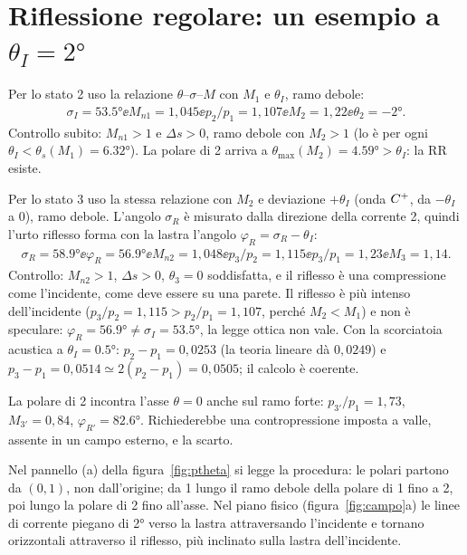 \section*{Riflessione regolare: un esempio a $\theta_I=\ang{2}$}
Per lo stato 2 uso la relazione $\theta$--$\sigma$--$M$ con $M_1$ e $\theta_I$, ramo debole:
\begin{gather*}
\sigma_I=\ang{53.5}\ee M_{n1}=1{,}045\ee p_2/p_1=1{,}107\ee M_2=1{,}22\ee \theta_2=-\ang{2}.
\end{gather*}
Controllo subito: $M_{n1}>1$ e $\Delta s>0$, ramo debole con $M_2>1$ (lo è per ogni $\theta_I<\theta_s(M_1)=\ang{6.32}$).
La polare di 2 arriva a $\theta_{\max}(M_2)=\ang{4.59}>\theta_I$: la RR esiste.

Per lo stato 3 uso la stessa relazione con $M_2$ e deviazione $+\theta_I$ (onda $C^{+}$, da $-\theta_I$ a 0), ramo
debole. L'angolo $\sigma_R$ è misurato dalla direzione della corrente 2, quindi l'urto riflesso forma con la lastra
l'angolo $\varphi_R=\sigma_R-\theta_I$:
\begin{gather*}
\sigma_R=\ang{58.9}\ee \varphi_R=\ang{56.9}\ee M_{n2}=1{,}048\ee p_3/p_2=1{,}115\ee p_3/p_1=1{,}23\ee M_3=1{,}14.
\end{gather*}
Controllo: $M_{n2}>1$, $\Delta s>0$, $\theta_3=0$ soddisfatta, e il riflesso è una compressione come l'incidente, come
deve essere su una parete. Il riflesso è più intenso dell'incidente ($p_3/p_2=1{,}115>p_2/p_1=1{,}107$, perché
$M_2<M_1$) e non è speculare: $\varphi_R=\ang{56.9}\ne\sigma_I=\ang{53.5}$, la legge ottica non vale. Con la
scorciatoia acustica a $\theta_I=\ang{0.5}$: $p_2-p_1=0{,}0253$ (la teoria lineare dà $0{,}0249$) e
$p_3-p_1=0{,}0514\simeq2(p_2-p_1)=0{,}0505$; il calcolo è coerente.

La polare di 2 incontra l'asse $\theta=0$ anche sul ramo forte: $p_{3'}/p_1=1{,}73$, $M_{3'}=0{,}84$,
$\varphi_{R'}=\ang{82.6}$. Richiederebbe una contropressione imposta a valle, assente in un campo esterno, e la
scarto.


Nel pannello (a) della figura~\ref{fig:ptheta} si legge la procedura: le polari partono da $(0,1)$, non
dall'origine; da 1 lungo il ramo debole della polare di 1 fino a 2, poi lungo la polare di 2 fino all'asse. Nel piano
fisico (figura~\ref{fig:campo}a) le linee di corrente piegano di \ang{2} verso la lastra attraversando l'incidente e
tornano orizzontali attraverso il riflesso, più inclinato sulla lastra dell'incidente.

